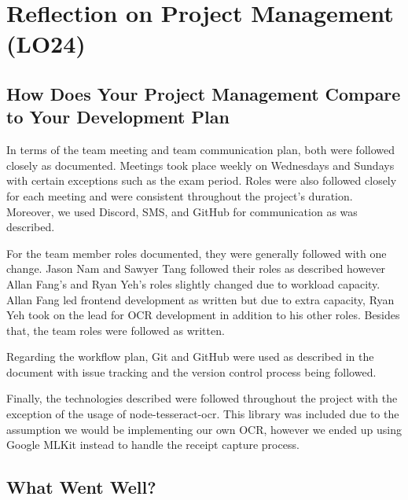\documentclass{article}
\begin{document}
\section{Reflection on Project Management (LO24)}


\subsection{How Does Your Project Management Compare to Your Development Plan}


In terms of the team meeting and team communication plan, both were followed closely as documented.
Meetings took place weekly on Wednesdays and Sundays with certain exceptions such as the exam period. Roles were
also followed closely for each meeting and were consistent throughout the project's duration. Moreover, we used Discord,
SMS, and GitHub for communication as was described.

For the team member roles documented, they were generally followed with one change. Jason Nam and Sawyer Tang
followed their roles as described however Allan Fang's and Ryan Yeh's roles slightly changed due to workload capacity.
Allan Fang led frontend development as written but due to extra capacity, Ryan Yeh took on the lead for OCR development in addition
to his other roles. Besides that, the team roles were followed as written.

Regarding the workflow plan, Git and GitHub were used as described in the document with issue tracking and the
version control process being followed.

Finally, the technologies described were followed throughout the project with the exception of the usage of
node-tesseract-ocr. This library was included due to the assumption we would be implementing our own OCR, however
we ended up using Google MLKit instead to handle the receipt capture process.

\subsection{What Went Well?}

\end{document}
